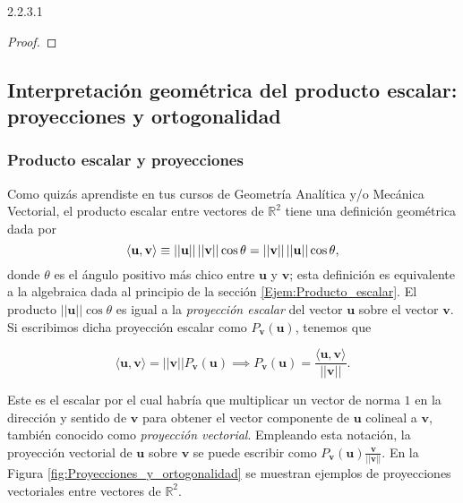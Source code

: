 \documentclass[notasLineal]{subfile}
\begin{document}
\begin{Teo} {2.2.3.1}
\begin{proof}
\end{proof}
\end{Teo}

\newpage
\subsection*{Interpretación geométrica del producto escalar: proyecciones y ortogonalidad}\label{Ssec:Interpretación geométrica del producto escalar} 

\subsubsection{Producto escalar y proyecciones} \label{Ssec:Producto_escalar_y_proyecciones}

Como quizás aprendiste en tus cursos de Geometría Analítica y/o Mecánica Vectorial, el producto escalar entre vectores de $\mathbb{R}^2$ tiene una definición geométrica dada por $$\langle\mathbf{u},\mathbf{v}\rangle\equiv ||\mathbf{u}||\hspace{0.5mm}||\mathbf{v}||\cos{\theta}=||\mathbf{v}||\hspace{0.5mm} ||\mathbf{u}||\cos{\theta},$$ \noindent donde $\theta$ es el ángulo positivo más chico entre $\mathbf{u}$ y $\mathbf{v}$; esta definición es equivalente a la algebraica dada al principio de la sección \ref{Ejem:Producto_escalar}. El producto $||\mathbf{u}||\cos{\theta}$ es igual a la \emph{proyección escalar} del vector $\mathbf{u}$ sobre el vector $\mathbf{v}$. Si escribimos dicha proyección escalar como $P_{\mathbf{v}}(\mathbf{u})$, tenemos que

$$\langle\mathbf{u},\mathbf{v}\rangle=||\mathbf{v}||P_{\mathbf{v}}(\mathbf{u}) \implies P_{\mathbf{v}}(\mathbf{u})=\frac{\langle\mathbf{u},\mathbf{v}\rangle}{||\mathbf{v}||}.$$ 

\noindent Este es el escalar por el cual habría que multiplicar un vector de norma $1$ en la dirección y sentido de $\mathbf{v}$ para obtener el vector componente de $\mathbf{u}$ colineal a $\mathbf{v}$, también conocido como \emph{proyección vectorial}. Empleando esta notación, la proyección vectorial de $\mathbf{u}$ sobre $\mathbf{v}$ se puede escribir como $P_{\mathbf{v}}(\mathbf{u})\frac{\mathbf{v}}{||\mathbf{v}||} .$ En la Figura \ref{fig:Proyecciones_y_ortogonalidad} se muestran ejemplos de proyecciones vectoriales entre vectores de $\mathbb{R}^2$.
\end{document}
